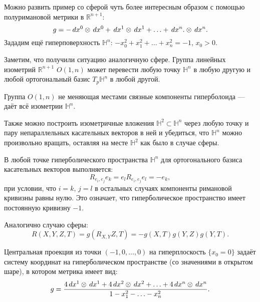 Можно развить пример со сферой чуть более интересным образом с помощью полуримановой метрики в $\mathbb{R}^{n+1}$:
\begin{equation*}
	g = - \, d x^0 \otimes \, d x^0 + \, d x^1 \otimes \, d x^1 + \ldots + \, d x^n. \otimes \, d x^n.
\end{equation*}
Зададим ещё гиперповерхность $\mathbb{H}^n$: $-x_0^2 + x^2_1 + \ldots + x_n^2 = -1 $, $x_0 >0$.

Заметим, что получили ситуацию аналогичную сфере. Группа линейных изометрий $\mathbb{R}^{n+1}$ $O(1,n)$ может перевести любую точку $\mathbb{H}^n $ в любую другую и любой ортогональный базис $T_p \mathbb{H}^n$ в любой другой.

\begin{to_tas}
	Группа $O(1,n)$ не меняющая местами связные компоненты гиперболоида --- даёт всё изометрии $\mathbb{H}^n$.
\end{to_tas}

Также можно построить изометричные вложения $\mathbb{H}^2 \subset \mathbb{H}^n$ через любую точку и пару непараллельных касательных векторов в ней и убедиться, что $\mathbb{H}^n$ можно произвольно вращать, оставляя на месте $\mathbb{H}^2$ как было в случае сферы.

\begin{to_thr}
	В любой точке гиперболического пространства $\mathbb{H}^n$ для ортогонального базиса касательных векторов выполняется:
	\begin{equation*}
		R_{e_i,e_j}e_k = e_l R_{e_i, e_j} e_l = -e_k,
	\end{equation*}
	при условии, что $i = k$, $j = l$ в остальных случаях компоненты римановой кривизны равны нулю. Это означает, что гиперболическое пространство имеет постоянную кривизну $-1$.
\end{to_thr}

Аналогично случаю сферы:
\begin{equation*}
	R(X,Y,Z,T) = g(R_{X,Y}Z,T) = - g (X,T) g(Y,Z) g (Y,T).
\end{equation*}

\begin{to_tas}
	Центральная проекция из точки $(-1,0,\ldots,0)$ на гиперплоскость $\{x_0=0\}$ задаёт систему координат на гиперболическом пространстве (со значениями в открытом шаре), в котором метрика имеет вид:
	\begin{equation*}
		g = \frac{4 \, d x^1 \otimes \, d x^1 + 4 \, d x^2 \otimes \, d x^2 + \ldots+ 4 \, d x^n \otimes \, d x^n}{1 - x_1^2 - \ldots - x_n^2}.
	\end{equation*}
\end{to_tas}

